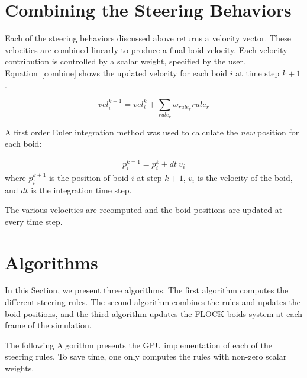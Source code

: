 \section{Combining the Steering Behaviors}
Each of the steering behaviors discussed above returns a velocity vector. These velocities are combined linearly to produce a final boid velocity. Each velocity contribution is controlled by a scalar weight, specified by the user. Equation~\ref{combine} shows the updated velocity for each boid $i$ at time step $k+1$.

\begin{equation}
\label{combine}
vel_i^{k+1} = vel_i^{k} + \sum_{rule_r} w_{rule_r} {rule_r} 
\end{equation}

A first order Euler integration method was used  to calculate the \textit{new} position for each boid: 

\begin{align}
\label{integrate}
p_i^{k=1} = p_i^k + dt~ v_i
\end{align}
where $p_i^{k+1}$ is the position of boid $i$ at step $k+1$, $v_i$ is the velocity of the boid, and $dt$ is the integration time step. 

The various velocities are recomputed and the boid positions are updated at every time step. 

\section{Algorithms}

In this Section, we present three algorithms. The first algorithm computes the different steering rules. The second algorithm combines the rules and updates the boid positions, and the third algorithm updates the FLOCK boids system at each frame of the simulation. 

The following Algorithm presents the GPU implementation of each of the steering rules. To save time, one only computes the rules with non-zero scalar weights. 

